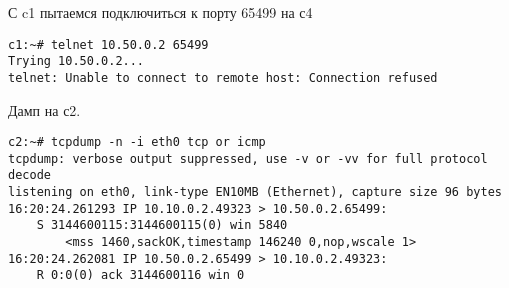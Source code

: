 \documentclass[a4paper,12pt]{article}
\begin{document}
С c1 пытаемся подключиться к порту 65499 на с4
\begin{Verbatim}
c1:~# telnet 10.50.0.2 65499
Trying 10.50.0.2...
telnet: Unable to connect to remote host: Connection refused
\end{Verbatim}

Дамп на с2.
\begin{Verbatim}
c2:~# tcpdump -n -i eth0 tcp or icmp
tcpdump: verbose output suppressed, use -v or -vv for full protocol decode
listening on eth0, link-type EN10MB (Ethernet), capture size 96 bytes
16:20:24.261293 IP 10.10.0.2.49323 > 10.50.0.2.65499: 
    S 3144600115:3144600115(0) win 5840 
        <mss 1460,sackOK,timestamp 146240 0,nop,wscale 1>
16:20:24.262081 IP 10.50.0.2.65499 > 10.10.0.2.49323: 
    R 0:0(0) ack 3144600116 win 0
\end{Verbatim}
\end{document}
